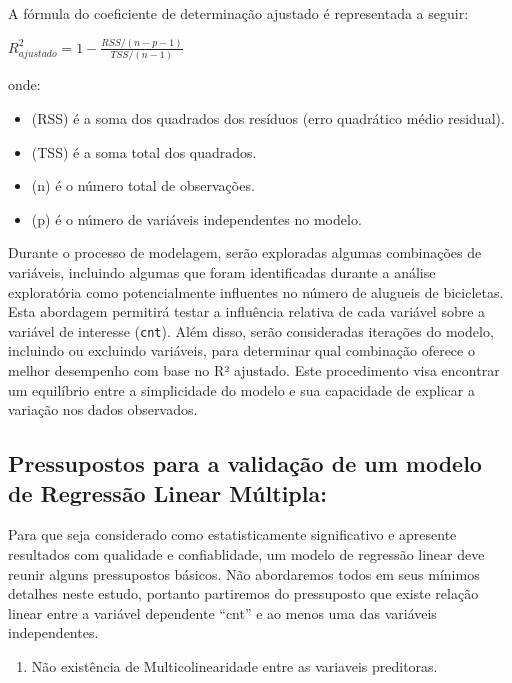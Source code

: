 \documentclass[
  letterpaper,
  DIV=11,
  numbers=noendperiod]{scrartcl}
\providecommand{\tightlist}{%
  \setlength{\itemsep}{0pt}\setlength{\parskip}{0pt}}\usepackage{longtable,booktabs,array}
\begin{document}
A fórmula do coeficiente de determinação ajustado é representada a
seguir:

\(R^2_{ajustado} = 1 - \frac{RSS / (n - p - 1)}{TSS / (n - 1)}\)

onde:

\begin{itemize}
\tightlist
\item
  (RSS) é a soma dos quadrados dos resíduos (erro quadrático médio
  residual).
\item
  (TSS) é a soma total dos quadrados.
\item
  (n) é o número total de observações.
\item
  (p) é o número de variáveis independentes no modelo.
\end{itemize}

Durante o processo de modelagem, serão exploradas algumas combinações de
variáveis, incluindo algumas que foram identificadas durante a análise
exploratória como potencialmente influentes no número de alugueis de
bicicletas. Esta abordagem permitirá testar a influência relativa de
cada variável sobre a variável de interesse (\texttt{cnt}). Além disso,
serão consideradas iterações do modelo, incluindo ou excluindo
variáveis, para determinar qual combinação oferece o melhor desempenho
com base no R² ajustado. Este procedimento visa encontrar um equilíbrio
entre a simplicidade do modelo e sua capacidade de explicar a variação
nos dados observados.

\subsection{Pressupostos para a validação de um modelo de Regressão
Linear
Múltipla:}\label{pressupostos-para-a-validauxe7uxe3o-de-um-modelo-de-regressuxe3o-linear-muxfaltipla}

Para que seja considerado como estatisticamente significativo e
apresente resultados com qualidade e confiablidade, um modelo de
regressão linear deve reunir alguns pressupostos básicos. Não
abordaremos todos em seus mínimos detalhes neste estudo, portanto
partiremos do pressuposto que existe relação linear entre a variável
dependente ``cnt'' e ao menos uma das variáveis independentes.

\begin{enumerate}
\def\labelenumi{\arabic{enumi})}
\tightlist
\item
  Não existência de Multicolinearidade entre as variaveis preditoras.
\end{enumerate}
\end{document}
